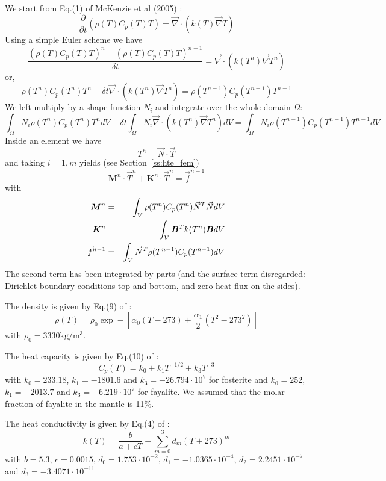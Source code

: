 We start from Eq.(1) of McKenzie et al (2005) \cite{mcjp05}:
\[
\frac{\partial}{\partial t}(\rho(T) C_p(T) T) = \vec\nabla \cdot (k(T) \vec\nabla T)
\]
Using a simple Euler scheme we have
\[
\frac{(\rho(T) C_p(T) T)^{n} - (\rho(T) C_p(T) T)^{n-1} }{\delta t} 
 = \vec\nabla \cdot (k(T^n) \vec\nabla T^n)
\]
or, 
\[
\rho(T^n) C_p(T^n) T^{n} - \delta t \vec\nabla \cdot (k(T^n) \vec\nabla T^n)
= \rho(T^{n-1}) C_p(T^{n-1}) T^{n-1} 
\]
We left multiply by a shape function $N_i$ and integrate over the whole domain $\Omega$:
\[
\int_\Omega N_i \rho(T^n) C_p(T^n) T^{n} dV-
\delta t \int_\Omega N_i \vec\nabla \cdot (k(T^n) \vec\nabla T^n) dV
= 
\int_\Omega N_i\rho(T^{n-1}) C_p(T^{n-1}) T^{n-1} dV
\]
Inside an element we have 
\[
T^h = \vec{N} \cdot \vec{T}
\]
and taking $i=1,m$ yields (see Section~\ref{ss:hte_fem})
\[
{\bm M}^n \cdot \vec{T}^n + {\bm K}^n \cdot \vec{T} ^n = \vec{f}^{n-1}
\]
with
\begin{eqnarray}
{\bm M}^n &=& \int_V \rho(T^n) C_p(T^n) \vec{N}^T \vec{N} dV  \nonumber\\
{\bm K}^n &=& \int_V {\bm B}^T k(T^n) {\bm B} dV \nonumber\\
\vec{f}^{n-1} &=& \int_V \vec{N}^T \rho(T^{n-1}) C_p(T^{n-1}) dV \nonumber
\end{eqnarray}
The second term has been integrated by parts (and the surface term disregarded:
Dirichlet boundary conditions top and bottom, and zero heat flux on the sides).


The density is given by Eq.(9) of \cite{mcjp05}:
\begin{equation}
\rho(T)=\rho_0 \exp -\left[\alpha_0 (T-273) + \frac{\alpha_1}{2} (T^2-273^2) \right]
\label{eq:f83_1}
\end{equation}
with $\rho_0=3330\si{\kg\per\cubic\meter}$.

The heat capacity is given by Eq.(10) of \cite{mcjp05}:
\begin{equation}
C_p(T) = k_0 + k_1 T^{-1/2} + k_3 T^{-3}
\label{eq:f83_2}
\end{equation}
with $k_0=233.18$, $k_1=-1801.6$ and $k_3=-26.794\cdot 10^{7}$ for fosterite and 
$k_0=252$, $k_1=-2013.7$ and $k_3=-6.219\cdot10^{7}$ for fayalite. We assumed that the
molar fraction of fayalite in the mantle is 11\%. 

The heat conductivity is given by Eq.(4) of \cite{mcjp05}:
\begin{equation}
k(T)=\frac{b}{a+cT} + \sum_{m=0}^3 d_m (T+273)^m
\label{eq:f83_3}
\end{equation}
with $b=5.3$, $c=0.0015$, $d_0=1.753\cdot10^{-2}$, $d_1=-1.0365\cdot10^{-4}$, $d_2=2.2451\cdot10^{-7}$ and 
$d_3=-3.4071\cdot10^{-11}$



